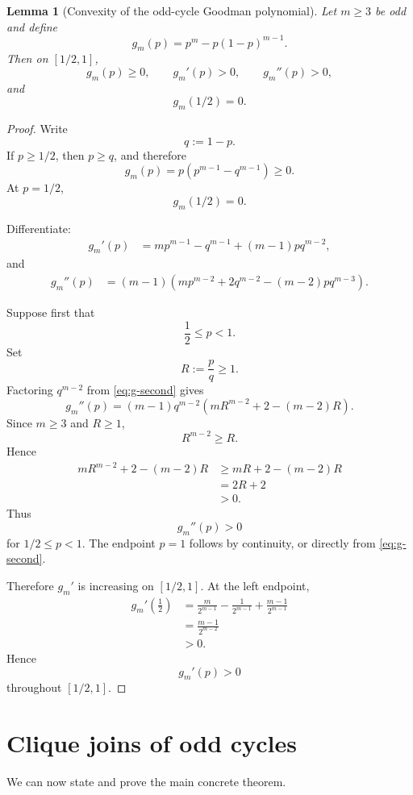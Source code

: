 \documentclass[11pt]{article}
\newtheorem{lemma}[theorem]{Lemma}
\newcommand{\1}{\mathbf{1}}
\begin{document}
\begin{lemma}[Convexity of the odd-cycle Goodman polynomial]
\label{lem:odd-convexity}
Let $m\ge3$ be odd and define
\[
g_m(p)
=
p^m-p(1-p)^{m-1}.
\]
Then on $[1/2,1]$,
\[
g_m(p)\ge0,
\qquad
g_m'(p)>0,
\qquad
g_m''(p)>0,
\]
and
\[
g_m(1/2)=0.
\]
\end{lemma}

\begin{proof}
Write
\[
q:=1-p.
\]
If $p\ge1/2$, then $p\ge q$, and therefore
\[
g_m(p)
=
p\left(p^{m-1}-q^{m-1}\right)
\ge0.
\]
At $p=1/2$,
\[
g_m(1/2)=0.
\]

Differentiate:
\begin{align*}
g_m'(p)
&=
mp^{m-1}
-
q^{m-1}
+
(m-1)pq^{m-2},
\end{align*}
and
\begin{align}
g_m''(p)
&=
(m-1)
\left(
mp^{m-2}
+
2q^{m-2}
-
(m-2)pq^{m-3}
\right).
\tag{7.1}
\label{eq:g-second}
\end{align}

Suppose first that
\[
\frac12\le p<1.
\]
Set
\[
R:=\frac pq\ge1.
\]
Factoring $q^{m-2}$ from
\eqref{eq:g-second} gives
\[
g_m''(p)
=
(m-1)q^{m-2}
\left(
mR^{m-2}
+
2
-
(m-2)R
\right).
\]
Since $m\ge3$ and $R\ge1$,
\[
R^{m-2}\ge R.
\]
Hence
\begin{align*}
mR^{m-2}+2-(m-2)R
&\ge
mR+2-(m-2)R
\\
&=
2R+2
\\
&>0.
\end{align*}
Thus
\[
g_m''(p)>0
\]
for $1/2\le p<1$.  The endpoint $p=1$ follows by continuity, or
directly from \eqref{eq:g-second}.

Therefore $g_m'$ is increasing on $[1/2,1]$.  At the left endpoint,
\begin{align*}
g_m'\!\left(\frac12\right)
&=
\frac{m}{2^{m-1}}
-
\frac1{2^{m-1}}
+
\frac{m-1}{2^{m-1}}
\\
&=
\frac{m-1}{2^{m-2}}
\\
&>0.
\end{align*}
Hence
\[
g_m'(p)>0
\]
throughout $[1/2,1]$.
\end{proof}


\section{Clique joins of odd cycles}

We can now state and prove the main concrete theorem.
\end{document}
